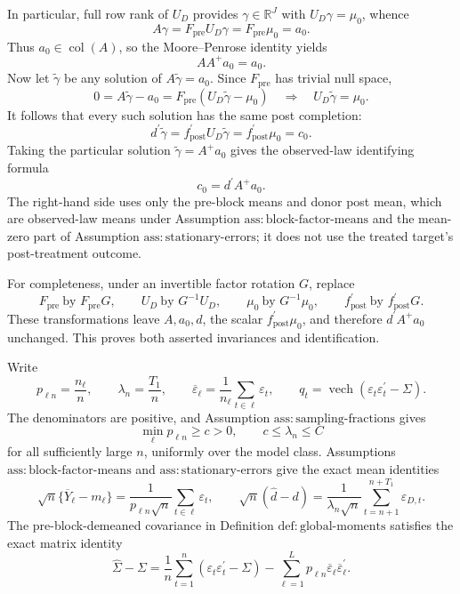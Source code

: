 In particular, full row rank of \(U_D\) provides \(\gamma\in\mathbb R^J\) with \(U_D\gamma=\mu_0\), whence
\[
A\gamma=F_{\mathrm{pre}}U_D\gamma
=F_{\mathrm{pre}}\mu_0=a_0.
\]
Thus \(a_0\in\operatorname{col}(A)\), so the Moore--Penrose identity yields
\[
AA^+a_0=a_0.
\]
Now let \(\widetilde\gamma\) be any solution of \(A\widetilde\gamma=a_0\).  Since \(F_{\mathrm{pre}}\) has trivial null space,
\[
0=A\widetilde\gamma-a_0
=F_{\mathrm{pre}}(U_D\widetilde\gamma-\mu_0)
\quad\Longrightarrow\quad
U_D\widetilde\gamma=\mu_0.
\]
It follows that every such solution has the same post completion:
\[
d^{\prime}\widetilde\gamma
=f_{\mathrm{post}}^{\prime}U_D\widetilde\gamma
=f_{\mathrm{post}}^{\prime}\mu_0=c_0.
\]
Taking the particular solution \(\widetilde\gamma=A^+a_0\) gives the observed-law identifying formula
\[
c_0=d^{\prime}A^+a_0.
\]
The right-hand side uses only the pre-block means and donor post mean, which are observed-law means under Assumption \(\mathrm{ass:block\mbox{-}factor\mbox{-}means}\) and the mean-zero part of Assumption \(\mathrm{ass:stationary\mbox{-}errors}\); it does not use the treated target's post-treatment outcome.

For completeness, under an invertible factor rotation \(G\), replace
\[
F_{\mathrm{pre}}\ \text{by }F_{\mathrm{pre}}G,\qquad
U_D\ \text{by }G^{-1}U_D,\qquad
\mu_0\ \text{by }G^{-1}\mu_0,\qquad
f_{\mathrm{post}}^{\prime}\ \text{by }f_{\mathrm{post}}^{\prime}G.
\]
These transformations leave \(A,a_0,d\), the scalar \(f_{\mathrm{post}}^{\prime}\mu_0\), and therefore \(d^{\prime}A^+a_0\) unchanged.  This proves both asserted invariances and identification.

Write
\[
p_{\ell n}=\frac{n_\ell}{n},\qquad
\lambda_n=\frac{T_1}{n},\qquad
\overline\varepsilon_\ell=\frac1{n_\ell}\sum_{t\in\ell}\varepsilon_t,
\qquad
q_t=\operatorname{vech}(\varepsilon_t\varepsilon_t^{\prime}-\Sigma).
\]
The denominators are positive, and Assumption \(\mathrm{ass:sampling\mbox{-}fractions}\) gives
\[
\min_\ell p_{\ell n}\geq c>0,\qquad
c\leq\lambda_n\leq C
\]
for all sufficiently large \(n\), uniformly over the model class.  Assumptions \(\mathrm{ass:block\mbox{-}factor\mbox{-}means}\) and \(\mathrm{ass:stationary\mbox{-}errors}\) give the exact mean identities
\[
\sqrt n\{\overline Y_\ell-m_\ell\}
=\frac1{p_{\ell n}\sqrt n}
\sum_{t\in\ell}\varepsilon_t,
\qquad
\sqrt n(\widehat d-d)
=\frac1{\lambda_n\sqrt n}
\sum_{t=n+1}^{n+T_1}\varepsilon_{D,t}.
\]
The pre-block-demeaned covariance in Definition \(\mathrm{def:global\mbox{-}moments}\) satisfies the exact matrix identity
\[
\widehat\Sigma-\Sigma
=\frac1n\sum_{t=1}^{n}
(\varepsilon_t\varepsilon_t^{\prime}-\Sigma)
-\sum_{\ell=1}^{L}p_{\ell n}
\overline\varepsilon_\ell\overline\varepsilon_\ell^{\prime}.
\tag{1}
\]

